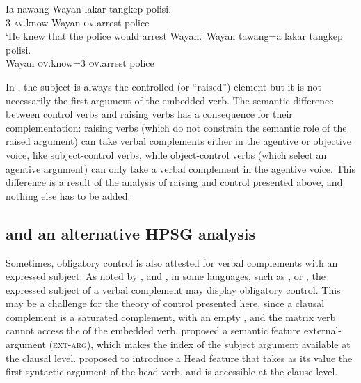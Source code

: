 \ex
\label{ov}
\gll Ia nawang           Wayan lakar  tangkep            polisi.\\
     3  \textsc{av}.know Wayan \FUT{} \textsc{ov}.arrest police\\
\glt `He knew that the police would arrest Wayan.'
\ex
\label{rais-ov}
\gll Wayan tawang=a           lakar  tangkep            polisi. \\
     Wayan \textsc{ov}.know=3 \FUT{} \textsc{ov}.arrest police\\ 
\zl


In , the subject is always the controlled (or ``raised'') element but it is not
necessarily the first argument of the embedded verb. The semantic difference between control verbs
and raising verbs has a consequence for their complementation: raising verbs (which do not constrain
the semantic role of the raised argument) can take verbal complements either in the agentive or
objective voice, like subject-control verbs, while object-control verbs (which select an agentive argument) can only take a
verbal complement in the agentive voice. This difference is a result of the analysis of raising and
control presented above, and nothing else has to be added.



\subsection{\xarg and an alternative HPSG analysis}\label{section-xarg}

Sometimes, obligatory control is also attested for verbal complements with an expressed subject.  As
noted by \citet{Zec87a-u}, \citet{Farkas1988} and \citet[--116]{GH2001a-u}, in some languages, such
as ,  \citep{Kuno76a-u,Iida96a-u} or  \citep{Karimi2008},
the expressed subject of a verbal complement may display obligatory control. This may be a challenge
for the theory of control presented here, since a clausal complement is a saturated complement, with
an empty \subjl, and the matrix verb cannot access the \subjv of the embedded verb. \citet[]{SP91a-u} proposed a semantic feature external-argument (\textsc{ext-arg}), which makes the index of the
subject argument available at the clausal level.  \citet[409]{Sag2007a} proposed to introduce a Head
feature \xarg that takes as its value the first syntactic argument of the head verb, and is
accessible at the clause level.

